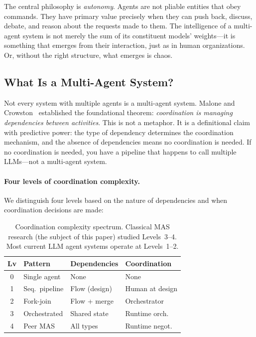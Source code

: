 \documentclass{article}
\begin{document}
\noindent
The central philosophy is \emph{autonomy}.  Agents are not pliable
entities that obey commands.  They have primary value precisely when they can push back,
discuss, debate, and reason about the requests made to them.  The intelligence of a
multi-agent system is not merely the sum of its constituent models' weights---it is
something that emerges from their interaction, just as in human organizations.  Or,
without the right structure, what emerges is chaos.

\subsection{What Is a Multi-Agent System?}
\label{sec:intro-mas-def}

Not every system with multiple agents is a multi-agent system.  Malone and
Crowston~\citep{malone1994interdisciplinary} established the foundational theorem:
\emph{coordination is managing dependencies between activities}.  This is not a
metaphor.  It is a definitional claim with predictive power: the type of dependency
determines the coordination mechanism, and the absence of dependencies means no
coordination is needed.  If no coordination is needed, you have a pipeline that happens
to call multiple LLMs---not a multi-agent system.

\paragraph{Four levels of coordination complexity.}
We distinguish four levels based on the nature of dependencies and when coordination
decisions are made:

\begin{table}[h]
\centering
\small
\caption{Coordination complexity spectrum.  Classical MAS research (the subject of
this paper) studied Levels~3--4.  Most current LLM agent systems operate at
Levels~1--2.}
\label{tab:coord-levels}
\footnotesize
\begin{tabular}{@{} c l p{2cm} p{2cm} @{}}
\toprule
\textbf{Lv} & \textbf{Pattern} & \textbf{Dependencies} & \textbf{Coordination} \\
\midrule
0 & Single agent & None & None \\
1 & Seq.\ pipeline & Flow (design) & Human at design \\
2 & Fork-join & Flow + merge & Orchestrator \\
3 & Orchestrated & Shared state & Runtime orch. \\
4 & Peer MAS & All types & Runtime negot. \\
\bottomrule
\end{tabular}
\end{table}
\end{document}
